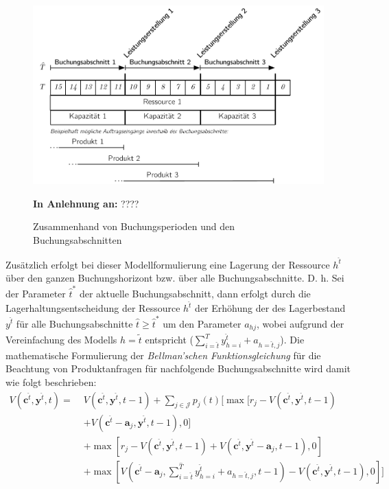 \begin{figure}[h!]
  \begin{center}
    \includegraphics[width=130mm]{Bilder/Leistungsperioden2.pdf}
    \caption{Zusammenhand von Buchungsperioden und den Buchungsabschnitten}  \label{LP2}
    {\footnotesize \textbf{In Anlehnung an:} ????} 
  \end{center}
\end{figure}

Zusätzlich erfolgt bei dieser Modellformulierung eine Lagerung der Ressource $h^{\hat t}$ über den ganzen Buchungshorizont bzw. über alle Buchungsabschnitte. D. h. Sei der Parameter $\hat{t}^*$ der aktuelle Buchungsabschnitt, dann erfolgt durch die Lagerhaltungsentscheidung der Ressource $h^{\hat t}$ der Erhöhung der des Lagerbestand $y^{\hat t}$ für alle Buchungsabschnitte $\hat t\ge \hat{t}^*$ um den Parameter $a_{hj}$, wobei aufgrund der Vereinfachung des Modells $h=\tilde t$ entspricht ($\sum_{i=\hat t}^{\hat T}y_{h=i}^{\hat{t}}+a_{h=\hat{t},j}$). Die mathematische Formulierung der \textit{Bellman'schen Funktionsgleichung} für die Beachtung von Produktanfragen für nachfolgende Buchungsabschnitte wird damit wie folgt beschrieben:
\begin{equation}\label{time}
\begin{alignat*}{2}
V(\textbf{c}^{\hat{t}}, \textbf{y}^{\hat{t}}, t) = \;& V(\textbf{c}^{\hat{t}}, \textbf{y}^{\hat{t}}, t-1)+ \sum_{j \in \mathcal{J}}p_{j}(t)[\max[r_{j} - V(\textbf{c}^{\hat{t}}, \textbf{y}^{\hat{t}}, t-1)\\
&+ V(\textbf{c}^{\hat{t}}-\textbf{a}_j, \textbf{y}^{\hat{t}}, t-1),0] \\
&+ \max[r_{j} - V(\textbf{c}^{\hat{t}}, \textbf{y}^{\hat{t}}, t-1) + V(\textbf{c}^{\hat{t}}, \textbf{y}^{\hat{t}}-\textbf{a}_j, t-1),0]\\
&+ \max[V(\textbf{c}^{\hat{t}}-\textbf{a}_j, \sum_{i=\hat t}^{\hat T}y_{h=i}^{\hat{t}}+a_{h=\hat{t},j}, t-1) - V(\textbf{c}^{\hat{t}}, \textbf{y}^{\hat{t}}, t-1) ,0]]\\
\end{alignat*}
\end{equation}

